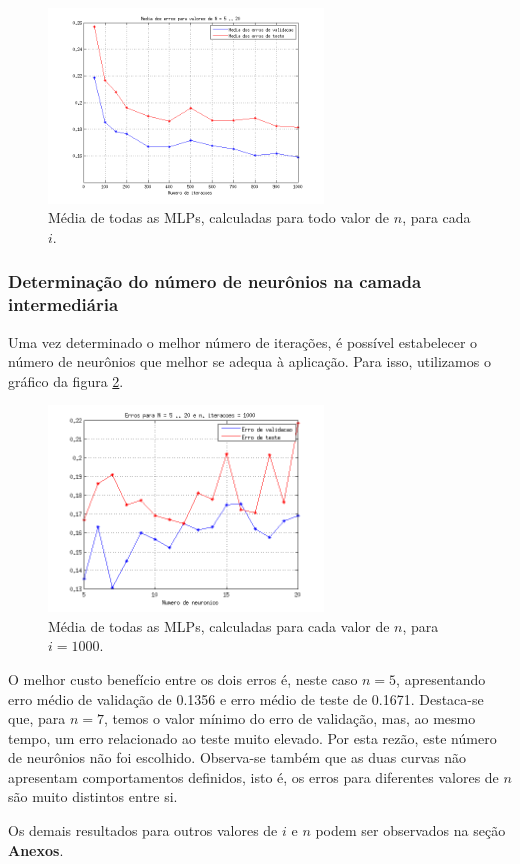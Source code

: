 \begin{figure}[H]
			\centering
			  \includegraphics[width=0.650\textwidth]{image/mlp_average_iterations}
			  \caption{Média de todas as MLPs, calculadas para todo valor de \(n\), para
			  cada \(i\).}
			  \label{fig:avg_iter}
	\end{figure}
	
	\FloatBarrier

\subsubsection{Determinação do número de neurônios na camada intermediária}
\label{sec:neuronios}

Uma vez determinado o melhor número de iterações, é possível estabelecer o
número de neurônios que melhor se adequa à aplicação. Para isso, utilizamos o
gráfico da figura \ref{fig:iter1000}.


	\begin{figure}[H]
			\centering
			  \includegraphics[width=0.650\textwidth]{image/mlp_1000_iterations}
			  \caption{Média de todas as MLPs, calculadas para cada valor de \(n\),
			  para \(i=1000\).}
			  \label{fig:iter1000}
	\end{figure}
	
	\FloatBarrier
	
O melhor custo benefício entre os dois erros é, neste caso \(n = 5\),
apresentando erro médio de validação de 0.1356 e erro médio de teste de 0.1671.
Destaca-se que, para \(n=7\), temos o valor mínimo do erro de validação, mas, ao
mesmo tempo, um erro relacionado ao teste muito elevado. Por esta rezão, este
número de neurônios não foi escolhido.  Observa-se também que as duas curvas não
apresentam comportamentos definidos, isto é, os erros para diferentes valores de
\(n\) são muito distintos entre si.

\vspace{12pt}

Os demais resultados para outros valores de \(i\) e \(n\) podem ser observados
na seção \textbf{Anexos}.
